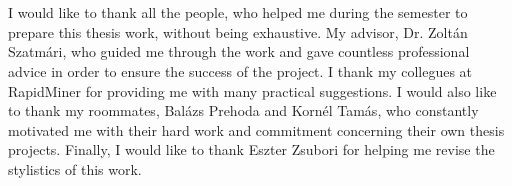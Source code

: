 \chapter*{\koszonetnyilvanitas}

I would like to thank all the people, who helped me during the semester to prepare this thesis work, without being exhaustive. My advisor, Dr. Zoltán Szatmári, who guided me through the work and gave countless professional advice in order to ensure the success of the project. I thank my collegues at RapidMiner for providing me with many practical suggestions. I would also like to thank my roommates, Balázs Prehoda and Kornél Tamás, who constantly motivated me with their hard work and commitment concerning their own thesis projects. Finally, I would like to thank Eszter Zsubori for helping me revise the stylistics of this work.